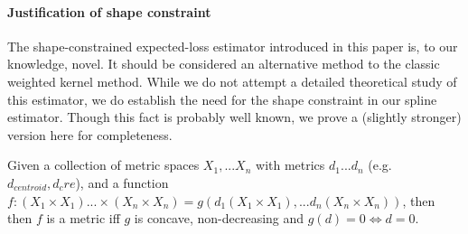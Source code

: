 


\newpage
\paragraph{Justification of shape constraint}

The shape-constrained expected-loss estimator introduced in this paper is, to our knowledge, novel.
It should be considered an alternative method to the classic weighted kernel method.
While we do not attempt a detailed theoretical study of this estimator, we do establish the need for the shape constraint in our spline estimator.
Though this fact is probably well known, we prove a (slightly stronger) version here for completeness.

\begin{proposition}
Given a collection of metric spaces $X_1, ... X_n$ with metrics $d_1 ... d_n$ (e.g. $d_{centroid}, d_cre$), and a function $f: (X_1 \times X_1) ... \times (X_n  \times X_n) = g(d_1(X_1 \times X_1),... d_n(X_n \times X_n))$, then then $f$ is a metric iff $g$ is concave, non-decreasing and $g(d) = 0 \Longleftrightarrow d = 0$.
\end{proposition}

